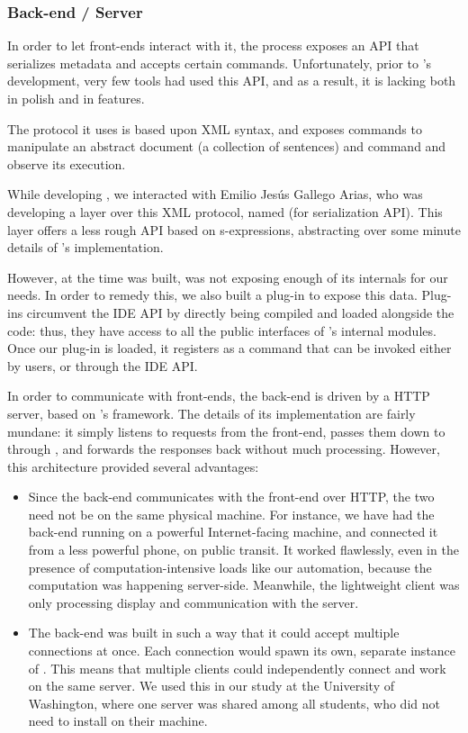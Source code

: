 \subsubsection*{Back-end / Server}

In order to let front-ends interact with it, the \Coq{} process exposes an API
that serializes metadata and accepts certain commands.  Unfortunately, prior to
\PeaCoq{}'s development, very few tools had used this API, and as a result, it
is lacking both in polish and in features.

The protocol it uses is based upon XML syntax, and exposes commands to
manipulate an abstract document (a collection of \Coq{} sentences) and command
and observe its execution.

While developing \PeaCoq{}, we interacted with Emilio Jesús Gallego Arias, who
was developing a layer over this XML protocol, named \SerAPI{} (for
serialization API).  This layer offers a less rough API based on s-expressions,
abstracting over some minute details of \Coq{}'s implementation.

However, at the time \PeaCoq{} was built, \Coq{} was not exposing enough of its
internals for our needs.  In order to remedy this, we also built a \Coq{}
plug-in to expose this data.  Plug-ins circumvent the IDE API by directly being
compiled and loaded alongside the \Coq{} code: thus, they have access to all the
public interfaces of \Coq{}'s internal modules.  Once our plug-in is loaded, it
registers as a \Vernacular{} command that can be invoked either by users, or
through the IDE API.\@

In order to communicate with front-ends, the back-end is driven by a HTTP
server, based on \Haskell{}'s \Snap{} framework.  The details of its
implementation are fairly mundane: it simply listens to requests from the
front-end, passes them down to \Coq{} through \SerAPI{}, and forwards the
responses back without much processing.  However, this architecture provided
several advantages:

\begin{itemize}

  \item Since the back-end communicates with the front-end over HTTP, the two
need not be on the same physical machine.  For instance, we have had the
back-end running on a powerful Internet-facing machine, and connected it from a
less powerful phone, on public transit.  It worked flawlessly, even in the
presence of computation-intensive loads like our automation, because the
computation was happening server-side.  Meanwhile, the lightweight client was
only processing display and communication with the server.

  \item The back-end was built in such a way that it could accept multiple
connections at once.  Each connection would spawn its own, separate instance of
\Coq{}.  This means that multiple clients could independently connect and work
on the same server.  We used this in our study at the University of Washington,
where one server was shared among all students, who did not need to install
\Coq{} on their machine.

\end{itemize}


